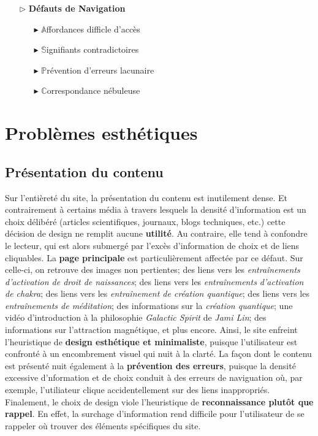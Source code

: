 \documentclass[9pt]{report}
\begin{document}
\begin{multicols*}{2}
    \begin{itemize}
    \item [$\rhd$ ] \textbf{Défauts de Navigation}  
      \begin{itemize}
        \item [$\blacktriangleright$ ] $\mathbb{A}$ffordances difficle d'accès 
        \item [$\blacktriangleright$ ] $\mathbb{S}$ignifiants contradictoires
        \item [$\blacktriangleright$ ] $\mathbb{P}$révention d'erreurs lacunaire
        \item [$\blacktriangleright$ ] $\mathbb{C}$orrespondance nébuleuse
      \end{itemize}
  \end{itemize}

  \section{Problèmes esthétiques}
  \subsection{Présentation du contenu}
  Sur l'entièreté du site, la présentation du contenu est 
  inutilement dense. Et contrairement à certains média 
  à travers lesquels la densité d'information est un choix délibéré 
  (articles scientifiques, journaux, blogs techniques, etc.) cette décision 
  de design ne remplit aucune \textbf{utilité}. Au contraire, elle 
  tend à confondre le lecteur, qui est alors submergé par l'excès 
  d'information 
  de choix et de liens cliquables. La \textbf{page principale} est particulièrement 
  affectée par ce défaut. Sur celle-ci, on retrouve des images 
  non pertientes; des liens vers les 
  \textit{entraînements d'activation de droit de naissances};  
  des liens vers les \textit{entraînements d'activation de chakra};
  des liens vers les \textit{entraînement de création quantique}; 
  des liens vers les \textit{entraînements de méditation}; des informations 
  sur la \textit{création quantique}; une vidéo d'introduction 
  à la philosophie \textit{Galactic Spirit} de \textit{Jami Lin}; 
  des informations sur l'attraction magnétique, et plus encore. 
  Ainsi, le site enfreint l'heuristique de 
  \textbf{design esthétique et minimaliste}, puisque l'utilisateur 
  est confronté à un encombrement visuel qui nuit à la clarté. 
  La façon dont le contenu est présenté nuit également 
  à la \textbf{prévention des erreurs}, puisque la densité 
  excessive d'nformation et de choix conduit à des erreurs de naviguation 
  où, par exemple, l'utiliateur clique accidentellement sur des 
  liens inappropriés. Finalement, le choix de design viole l'heuristique de 
  \textbf{reconnaissance plutôt que rappel}. En effet, la surchage 
  d'information rend difficile pour l'utilisateur de se rappeler 
  où trouver des éléments spécifiques du site. 



\end{multicols*}
\end{document}
